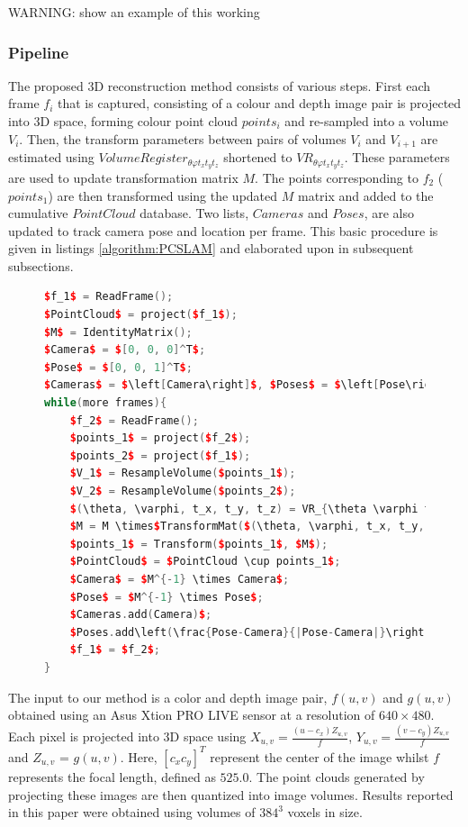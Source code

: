 WARNING: show an example of this working

\subsubsection{Pipeline}

\label{METHOD_SECLL}
The proposed 3D reconstruction method consists of various steps. First each frame $f_i$ that is captured, consisting of a colour and depth image pair is projected into 3D space, forming colour point cloud $points_i$ and re-sampled into a volume $V_i$. Then, the transform parameters between pairs of volumes $V_i$ and $V_{i+1}$ are estimated using $VolumeRegister_{\theta \varphi t_x t_y t_z}$ shortened to $VR_{\theta \varphi t_x t_y t_z}$. These parameters are used to update transformation matrix $M$. The points corresponding to $f_2$ ($points_1$) are then transformed using the updated $M$ matrix and added to the cumulative $PointCloud$ database. Two lists, $Cameras$ and $Poses$, are also updated to track camera pose and location per frame. This basic procedure is given in listings \ref{algorithm:PCSLAM} and elaborated upon in subsequent subsections.
\begin{figure}
\begin{lstlisting}[language=c++,caption=Phase Correlation Based SLAM Algorithm,label=algorithm:PCSLAM,mathescape,basicstyle=\ttfamily]
$f_1$ = ReadFrame();
$PointCloud$ = project($f_1$);
$M$ = IdentityMatrix();
$Camera$ = $[0, 0, 0]^T$;
$Pose$ = $[0, 0, 1]^T$;
$Cameras$ = $\left[Camera\right]$, $Poses$ = $\left[Pose\right]$;
while(more frames){
	$f_2$ = ReadFrame();
	$points_1$ = project($f_2$);
	$points_2$ = project($f_1$);
	$V_1$ = ResampleVolume($points_1$);
	$V_2$ = ResampleVolume($points_2$);
	$(\theta, \varphi, t_x, t_y, t_z) = VR_{\theta \varphi t_x t_y t_z}(V_1, V_2)$;
	$M = M \times$TransformMat($(\theta, \varphi, t_x, t_y, t_z)$);
	$points_1$ = Transform($points_1$, $M$);
	$PointCloud$ = $PointCloud \cup points_1$;
	$Camera$ = $M^{-1} \times Camera$;
	$Pose$ = $M^{-1} \times Pose$;
	$Cameras.add(Camera)$;
	$Poses.add\left(\frac{Pose-Camera}{|Pose-Camera|}\right)$;
	$f_1$ = $f_2$;
}
\end{lstlisting}
\end{figure}


The input to our method is a color and depth image pair, $f(u,v)$ and $g(u,v)$ obtained using an Asus Xtion PRO LIVE sensor at a resolution of $640 \times 480$. Each pixel is projected into 3D space using $X_{u,v} = \frac{(u - c_x)Z_{u,v}}{f}$, $Y_{u,v} = \frac{(v - c_y)Z_{u,v}}{f}$ and $Z_{u,v}$ = $g(u,v)$. 
Here, $[c_x c_y]^T$ represent the center of the image whilst $f$ represents the focal length, defined as $525.0$. The point clouds generated by projecting these images are then quantized into image volumes. Results reported in this paper were obtained using volumes of $384^3$ voxels in size.

